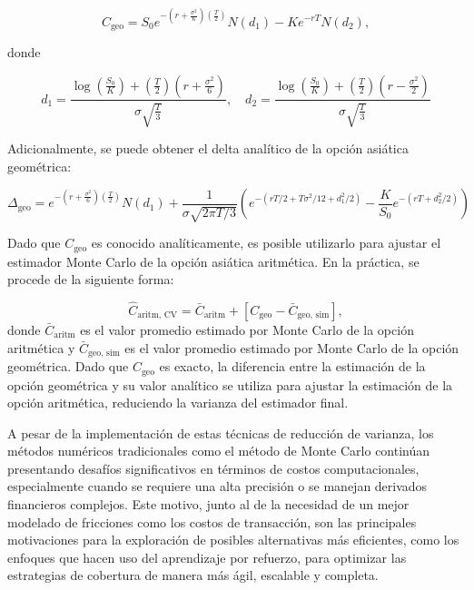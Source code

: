 \documentclass[11pt,a4paper,spanish]{article}
\numberwithin{equation}{section} %
\begin{document}
\begin{equation}
C_{\text{geo}} = S_0 e^{-\left(r + \frac{\sigma^2}{6}\right)\left(\frac{T}{2}\right)} N(d_1) - K e^{-rT} N(d_2),
\end{equation}

donde

\begin{equation}
d_1 = \frac{\log\left(\frac{S_0}{K}\right) + \left(\frac{T}{2}\right)\left(r + \frac{\sigma^2}{6}\right)}{\sigma \sqrt{\frac{T}{3}}}, \quad
d_2 = \frac{\log\left(\frac{S_0}{K}\right) + \left(\frac{T}{2}\right)\left(r - \frac{\sigma^2}{2}\right)}{\sigma \sqrt{\frac{T}{3}}}
\end{equation}

Adicionalmente, se puede obtener el delta analítico de la opción asiática geométrica:

\begin{equation}
\Delta_{\text{geo}} = e^{-\left(r + \frac{\sigma^2}{6}\right)\left(\frac{T}{2}\right)} N(d_1)
+ \frac{1}{\sigma \sqrt{2\pi T / 3}} \left( e^{-(rT/2 + T\sigma^2/12 + d_1^2/2)} - \frac{K}{S_0} e^{-(rT + d_2^2 / 2)} \right)
\label{eq:delta_geo}
\end{equation}

Dado que $C_{\text{geo}}$ es conocido analíticamente, es posible utilizarlo para ajustar el estimador Monte Carlo de la opción asiática aritmética. En la práctica, se procede de la siguiente forma:

\begin{equation}
\hat{C}_{\text{aritm, CV}} = \bar{C}_{\text{aritm}} + [C_{\text{geo}} - \bar{C}_{\text{geo, sim}}],
\end{equation}
donde $\bar{C}_{\text{aritm}}$ es el valor promedio estimado por Monte Carlo de la opción aritmética y $\bar{C}_{\text{geo, sim}}$ es el valor promedio estimado por Monte Carlo de la opción geométrica. Dado que $C_{\text{geo}}$ es exacto, la diferencia entre la estimación de la opción geométrica y su valor analítico se utiliza para ajustar la estimación de la opción aritmética, reduciendo la varianza del estimador final.

A pesar de la implementación de estas técnicas de reducción de varianza, los métodos numéricos tradicionales como el método de Monte Carlo continúan presentando desafíos significativos en términos de costos computacionales, especialmente cuando se requiere una alta precisión o se manejan derivados financieros complejos. Este motivo, junto al de la necesidad de un mejor modelado de fricciones como los costos de transacción, son las principales motivaciones para la exploración de posibles alternativas más eficientes, como los enfoques que hacen uso del aprendizaje por refuerzo,  para optimizar las estrategias de cobertura de manera más ágil, escalable y completa.
\end{document}
